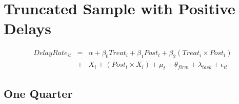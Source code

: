 \documentclass[
]{article}
\begin{document}
\hypertarget{truncated-sample-with-positive-delays}{%
\section{Truncated Sample with Positive
Delays}\label{truncated-sample-with-positive-delays}}

\[ \begin{aligned} DelayRate_{it} &=& \alpha+\beta_0 Treat_i + \beta_1 Post_t + \beta_2 (Treat_i \times Post_t)\\
&+&  X_i + (Post_t \times X_i) + \mu_t + \theta_{firm} + \lambda_{task}+ \epsilon_{it}
\end{aligned}\]

\hypertarget{one-quarter-1}{%
\subsection{One Quarter}\label{one-quarter-1}}
\end{document}
